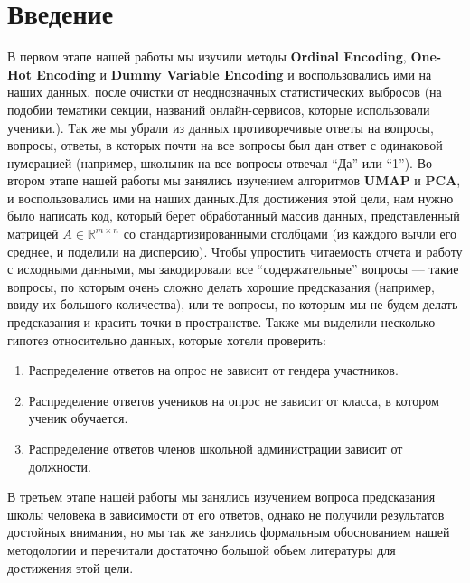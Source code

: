 \section{Введение} \label{sec:intro}

В первом этапе нашей работы мы изучили методы {\bf Ordinal Encoding}, {\bf One-Hot Encoding} и {\bf Dummy Variable Encoding} и воспользовались ими на наших данных, после очистки от неоднозначных статистических выбросов (на подобии тематики секции, названий онлайн-сервисов, которые использовали ученики.). Так же мы убрали из данных противоречивые ответы на вопросы, вопросы, ответы, в которых почти на все вопросы был дан ответ с одинаковой нумерацией (например, школьник на все вопросы отвечал \enquote{Да} или \enquote{1}). 
Во втором этапе нашей работы мы занялись изучением алгоритмов {\bf UMAP} и {\bf PCA}, и воспользовались ими на наших данных.Для достижения этой цели, нам нужно было написать код, который берет обработанный массив данных, представленный матрицей $A \in \mathbb{R}^{m \times n}$ со стандартизированными столбцами (из каждого вычли его среднее, и поделили на дисперсию).
Чтобы упростить читаемость отчета и работу с исходными данными, мы закодировали все \enquote{содержательные} вопросы --- такие вопросы, по которым очень сложно делать хорошие предсказания (например, ввиду их большого количества), или те вопросы, по которым мы не будем делать предсказания и красить точки в пространстве.
Также мы выделили несколько гипотез относительно данных, которые хотели проверить:
\begin{enumerate}
    \item Распределение ответов на опрос не зависит от гендера участников.
    \item Распределение ответов учеников на опрос не зависит от класса, в котором ученик обучается.
    \item Распределение ответов членов школьной администрации зависит от должности.
\end{enumerate}
В третьем этапе нашей работы мы занялись изучением вопроса предсказания школы человека в зависимости от его ответов, однако не получили результатов достойных внимания, но мы так же занялись формальным обоснованием нашей методологии и перечитали достаточно большой объем литературы для достижения этой цели.

